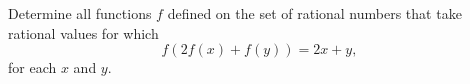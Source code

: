 Determine all functions $ f$ defined on the set of rational numbers that take rational values for which\[ f(2f(x) + f(y)) = 2x + y,\]
for each $ x$ and $ y$.
